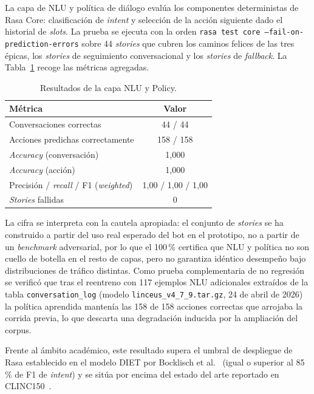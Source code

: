 La capa de NLU y política de diálogo evalúa los componentes deterministas de Rasa Core: clasificación de \textit{intent} y selección de la acción siguiente dado el historial de \textit{slots}. La prueba se ejecuta con la orden \texttt{rasa test core --fail-on-prediction-errors} sobre 44 \textit{stories} que cubren los caminos felices de las tres épicas, los \textit{stories} de seguimiento conversacional y los \textit{stories} de \textit{fallback}. La Tabla~\ref{tab:nlu-resultados} recoge las métricas agregadas.

\begin{table}[hbtp]
\centering
\caption{Resultados de la capa NLU y Policy.}\label{tab:nlu-resultados}
\begin{tabular}{lc}
\hline
\textbf{Métrica} & \textbf{Valor} \\
\hline
Conversaciones correctas & 44 / 44 \\
Acciones predichas correctamente & 158 / 158 \\
\textit{Accuracy} (conversación) & 1{,}000 \\
\textit{Accuracy} (acción) & 1{,}000 \\
Precisión / \textit{recall} / F1 (\textit{weighted}) & 1{,}00 / 1{,}00 / 1{,}00 \\
\textit{Stories} fallidas & 0 \\
\hline
\end{tabular}
\end{table}

La cifra se interpreta con la cautela apropiada: el conjunto de \textit{stories} se ha construido a partir del uso real esperado del bot en el prototipo, no a partir de un \textit{benchmark} adversarial, por lo que el 100\,\% certifica que NLU y política no son cuello de botella en el resto de capas, pero no garantiza idéntico desempeño bajo distribuciones de tráfico distintas. Como prueba complementaria de no regresión se verificó que tras el reentreno con 117 ejemplos NLU adicionales extraídos de la tabla \texttt{conversation\_log} (modelo \texttt{linceus\_v4\_7\_9.tar.gz}, 24 de abril de 2026) la política aprendida mantenía las 158 de 158 acciones correctas que arrojaba la corrida previa, lo que descarta una degradación inducida por la ampliación del corpus.

Frente al ámbito académico, este resultado supera el umbral de despliegue de Rasa establecido en el modelo DIET por Bocklisch et al.~\cite{bocklisch2020diet} (igual o superior al 85\,\% de F1 de \textit{intent}) y se sitúa por encima del estado del arte reportado en CLINC150~\cite{casanueva2020efficient}.

